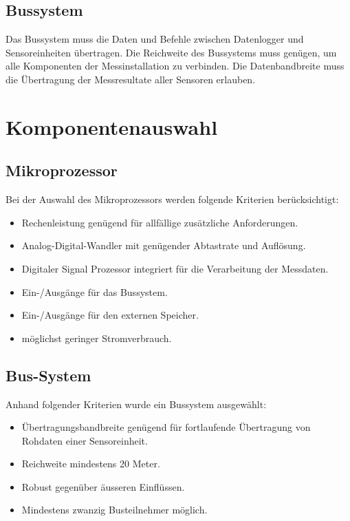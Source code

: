 \subsection{Bussystem}
Das Bussystem muss die Daten und Befehle zwischen Datenlogger und Sensoreinheiten übertragen. Die Reichweite des Bussystems muss genügen, um alle Komponenten der Messinstallation zu verbinden. Die Datenbandbreite muss die Übertragung der Messresultate aller Sensoren erlauben.


\section{Komponentenauswahl}

\subsection{Mikroprozessor}
Bei der Auswahl des Mikroprozessors werden folgende Kriterien berücksichtigt:

\begin{itemize}
\item Rechenleistung genügend für allfällige zusätzliche Anforderungen.
\item Analog-Digital-Wandler mit genügender Abtastrate und Auflösung.
\item Digitaler Signal Prozessor integriert für die Verarbeitung der Messdaten.
\item Ein-/Ausgänge für das Bussystem.
\item Ein-/Ausgänge für den externen Speicher.
\item möglichst geringer Stromverbrauch.
\end{itemize}


\subsection{Bus-System}
Anhand folgender Kriterien wurde ein Bussystem ausgewählt:

\begin{itemize}
\item Übertragungsbandbreite genügend für fortlaufende Übertragung von Rohdaten einer Sensoreinheit.
\item Reichweite mindestens 20 Meter.
\item Robust gegenüber äusseren Einflüssen.
\item Mindestens zwanzig Busteilnehmer möglich.
\end{itemize}

